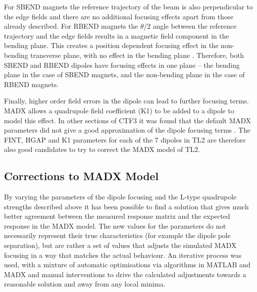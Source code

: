 
For SBEND magnets the reference trajectory of the beam is also perpendicular to the edge fields and there are no additional focusing effects apart from those already described. For RBEND magnets the \(\theta/2\) angle between the reference trajectory and the edge fields results in a magnetic field component in the bending plane. This creates a position dependent focusing effect in the non-bending transverse plane, with no effect in the bending plane \cite{mackay}. Therefore, both SBEND and RBEND dipoles have focusing effects in one plane -- the bending plane in the case of SBEND magnets, and the non-bending plane in the case of RBEND magnets.

Finally, higher order field errors in the dipole can lead to further focusing terms. MADX allows a quadrupole field coefficient (K1) to be added to a dipole to model this effect. In other sections of CTF3 it was found that the default MADX parameters did not give a good approximation of the dipole focusing terms \cite{benOptics}. The FINT, HGAP and K1 parameters for each of the 7 dipoles in TL2 are therefore also good candidates to try to correct the  MADX model of TL2.

\subsection{Corrections to MADX Model}
\label{ss:modelCorrections}

By varying the parameters of the dipole focusing and the L-type quadrupole strengths described above it has been possible to find a solution that gives much better agreement between the measured response matrix and the expected response in the MADX model. The new values for the parameters do not necessarily represent their true characteristics (for example the dipole pole separation), but are rather a set of values that adjusts the simulated MADX focusing in a way that matches the actual behaviour. An iterative process was used, with a mixture of automatic optimisations via algorithms in MATLAB and MADX and manual interventions to drive the calculated adjustments towards a reasonable solution and away from any local minima.

